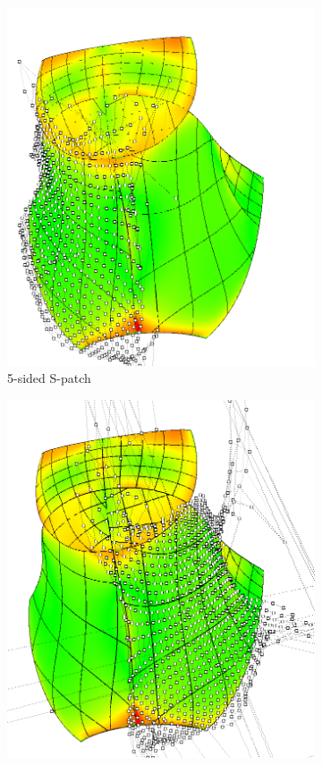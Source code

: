 \documentclass[9pt,academicons]{article}
\begin{document}
\begin{figure}
{\begin{subfigure}{.3\textwidth}
      \includegraphics[width=\textwidth]{images/cagd86/spatch2.png}
      \caption{5-sided S-patch}
      \label{fig:cagd86-5-sp}
    \end{subfigure}
    \hfill
    \begin{subfigure}{.3\textwidth}
      \centering
      \includegraphics[width=\textwidth]{images/cagd86/spatch1.png}

\end{subfigure}}
\end{figure}
\end{document}
